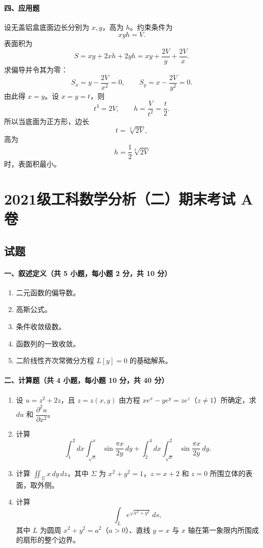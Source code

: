 \paragraph*{四、应用题}
设无盖铝盒底面边长分别为 $x,y$，高为 $h$。约束条件为
\[
  xyh=V.
\]
表面积为
\[
  S=xy+2xh+2yh=xy+\frac{2V}{y}+\frac{2V}{x}.
\]
求偏导并令其为零：
\[
  S_x=y-\frac{2V}{x^2}=0,\qquad
  S_y=x-\frac{2V}{y^2}=0.
\]
由此得 $x=y$。设 $x=y=t$，则
\[
  t^3=2V,\qquad h=\frac{V}{t^2}=\frac{t}{2}.
\]
所以当底面为正方形，边长
\[
  t=\sqrt[3]{2V},
\]
高为
\[
  h=\frac12\sqrt[3]{2V}
\]
时，表面积最小。

\section{2021级工科数学分析（二）期末考试 A 卷}

\subsection{试题}

\paragraph*{一、叙述定义（共 5 小题，每小题 2 分，共 10 分）}
\begin{enumerate}
  \item 二元函数的偏导数。
  \item 高斯公式。
  \item 条件收敛级数。
  \item 函数列的一致收敛。
  \item 二阶线性齐次常微分方程 $L[y]=0$ 的基础解系。
\end{enumerate}

\paragraph*{二、计算题（共 4 小题，每小题 10 分，共 40 分）}
\begin{enumerate}
  \item 设 $u=z^2+2z$，且 $z=z(x,y)$ 由方程 $xe^x-ye^y=ze^z$（$z\ne 1$）所确定，求 $du$ 和 $\dfrac{\partial^2u}{\partial x^2}$。
  \item 计算
  \[
    \int_1^2 dx\int_{\sqrt{x}}^x \sin\frac{\pi x}{2y}\,dy
    +\int_2^4 dx\int_{\sqrt{x}}^2 \sin\frac{\pi x}{2y}\,dy .
  \]
  \item 计算 $\iint_\Sigma x\,dy\,dz$，其中 $\Sigma$ 为 $x^2+y^2=1$，$z=x+2$ 和 $z=0$ 所围立体的表面，取外侧。
  \item 计算
  \[
    \int_L e^{\sqrt{x^2+y^2}}\,ds,
  \]
  其中 $L$ 为圆周 $x^2+y^2=a^2$（$a>0$）、直线 $y=x$ 与 $x$ 轴在第一象限内所围成的扇形的整个边界。
\end{enumerate}


